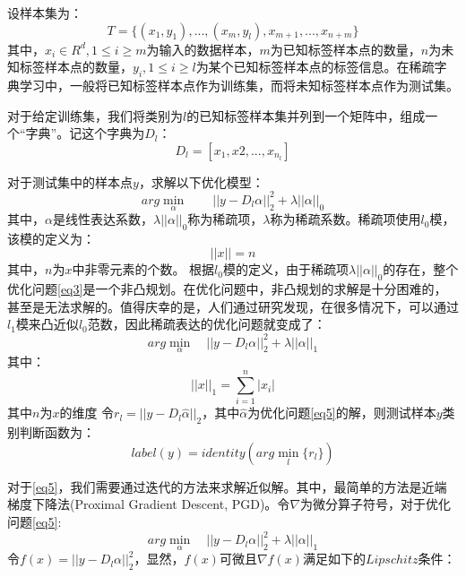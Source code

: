 \documentclass[12pt,a4paper]{article}
\begin{document}
设样本集为：
\begin{equation}\label{eq1}
T = \{(x_1, y_1), ... , (x_m, y_l), x_{m + 1}, ... , x_{n + m}\}
\end{equation}
其中，$x_i \in R^d, 1 \leq i \geq m $为输入的数据样本，$m$为已知标签样本点的数量，$n$为未知标签样本点的数量，$y_i, 1 \leq i \geq l$为某个已知标签样本点的标签信息。在稀疏字典学习中，一般将已知标签样本点作为训练集，而将未知标签样本点作为测试集。

对于给定训练集，我们将类别为$l$的已知标签样本集并列到一个矩阵中，组成一个“字典”。记这个字典为$D_{l}$：
\begin{equation}\label{eq2}
D_{l} = [x_1, x2, ... , x_{n_{l}}]
\end{equation}

对于测试集中的样本点$y$，求解以下优化模型：
\begin{equation}\label{eq3}
arg\min_{\alpha} \qquad ||y - D_{l}\alpha||_{2}^{2} + \lambda||\alpha||_{0}
\end{equation}
其中，$\alpha$是线性表达系数，$\lambda||\alpha||_{0}$称为稀疏项，$\lambda$称为稀疏系数。稀疏项使用$l_0$模，该模的定义为：
\begin{equation}\label{eq4}
||x|| = n
\end{equation}
其中，$n$为$x$中非零元素的个数。
根据$l_{0}$模的定义，由于稀疏项$\lambda||\alpha||_{0}$的存在，整个优化问题\eqref{eq3}是一个非凸规划。在优化问题中，非凸规划的求解是十分困难的，甚至是无法求解的。值得庆幸的是，人们通过研究发现，在很多情况下，可以通过$l_{1}$模来凸近似$l_{0}$范数，因此稀疏表达的优化问题就变成了：
\begin{equation}
\label{eq5}
arg\min_{\alpha} \quad ||y - D_{l}\alpha||_{2}^{2} + \lambda||\alpha||_{1}
\end{equation}
其中：
\begin{equation}
\label{eq6}
||x||_{1} = \sum_{i = 1}^{n} |x_{i}|
\end{equation}
其中$n$为$x$的维度
令$r_{l} = ||y - D_{l}\hat{\alpha}||_{2}$，其中$\hat{\alpha}$为优化问题\eqref{eq5}的解，则测试样本$y$类别判断函数为：
\begin{equation*}
label(y) = identity(arg\min_{l}\{r_{l}\})
\end{equation*}

对于\eqref{eq5}，我们需要通过迭代的方法来求解近似解。其中，最简单的方法是近端梯度下降法(Proximal Gradient Descent, PGD)。令$\nabla$为微分算子符号，对于优化问题\eqref{eq5}:
$$arg\min_{\alpha} \quad ||y - D_{l}\alpha||_{2}^{2} + \lambda||\alpha||_{1}$$
令$f(x) = ||y - D_{l}\alpha||_{2}^{2}$，显然，$f(x)$可微且$\nabla f(x)$满足如下的$Lipschitz$条件：
\end{document}
